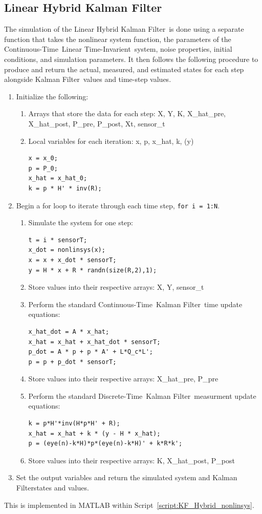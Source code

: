 \documentclass[]{article}
\renewcommand{\lstlistingname}{Script}
\newcommand{\scriptname}{\lstlistingname}
\newcommand{\KF}{Kalman Filter}
\newcommand{\CT}{Continuous-Time}
\newcommand{\DT}{Discrete-Time}
\newcommand{\DTKF}{\DT \ \KF}
\newcommand{\LTI}{Linear Time-Invarient}
\begin{document}
	\newpage
	\subsection{Linear Hybrid \KF} \label{sec:LinearHybridKF}
		The simulation of the Linear Hybrid \KF \ is done using a separate function that takes the nonlinear system function, the parameters of the \CT \ \LTI \ system, noise properties, initial conditions, and simulation parameters. It then follows the following procedure to produce and return the actual, measured, and estimated states for each step alongside \KF \ values and time-step values.
		\begin{enumerate}
			\item Initialize the following:
			\begin{enumerate}
				\item Arrays that store the data for each step: X, Y, K, X\_hat\_pre, X\_hat\_post, P\_pre, P\_post, Xt, sensor\_t\\
				\item Local variables for each iteration: x, p, x\_hat, k, (y)
\begin{lstlisting}
x = x_0;
p = P_0;
x_hat = x_hat_0;
k = p * H' * inv(R);
\end{lstlisting}
			\end{enumerate}
			\item Begin a for loop to iterate through each time step, \lstinline{for i = 1:N}.
			\begin{enumerate}
				\item Simulate the system for one step:
\begin{lstlisting}
t = i * sensorT;
x_dot = nonlinsys(x);
x = x + x_dot * sensorT;
y = H * x + R * randn(size(R,2),1);
\end{lstlisting}
				\item Store values into their respective arrays: X, Y, sensor\_t
				\item Perform the standard \CT \ \KF \ time update equations:
\begin{lstlisting}
x_hat_dot = A * x_hat;
x_hat = x_hat + x_hat_dot * sensorT;
p_dot = A * p + p * A' + L*Q_c*L';
p = p + p_dot * sensorT;
\end{lstlisting}
				\item Store values into their respective arrays: X\_hat\_pre, P\_pre
				\item Perform the standard \DTKF \ measurment update equations:
\begin{lstlisting}
k = p*H'*inv(H*p*H' + R);
x_hat = x_hat + k * (y - H * x_hat);
p = (eye(n)-k*H)*p*(eye(n)-k*H)' + k*R*k';
\end{lstlisting}
				\item Store values into their respective arrays: K, X\_hat\_post, P\_post
			\end{enumerate}
			\item Set the output variables and return the simulated system and \KF states and values.
		\end{enumerate}
		This is implemented in MATLAB within \scriptname \ \ref{script:KF_Hybrid_nonlinsys}.
	
\end{document}
